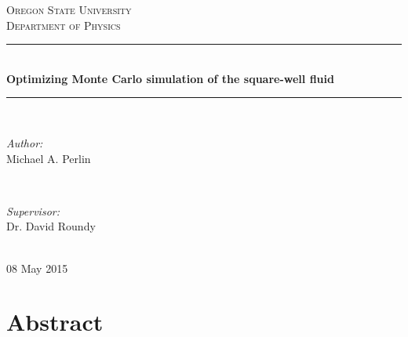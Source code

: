 \documentclass[11pt]{article}
\renewcommand{\title}{Optimizing Monte Carlo simulation of the
  square-well fluid} \renewcommand{\author}{Michael A. Perlin}
\newcommand{\institution}{Oregon State University}
\newcommand{\department}{Department of Physics}
\newcommand{\supervisor}{Dr. David Roundy}
\renewcommand{\date}{08 May 2015}
\begin{document}
\begin{titlepage}

  \newcommand{\HRule}{\rule{\linewidth}{0.5mm}}

  \center

  \textsc{\LARGE \institution}\\[1.5cm]
  \textsc{\Large \department}\\[0.5cm]

  \HRule \\[0.4cm]
  { \huge \bfseries \title}\\[0.4cm]
  \HRule \\[1.5cm]

  \begin{minipage}{0.4\textwidth}
    \begin{flushleft} \large
      \emph{Author:}\\
      \author
    \end{flushleft}
  \end{minipage}
  ~
  \begin{minipage}{0.4\textwidth}
    \begin{flushright} \large
      \emph{Supervisor:} \\
      \supervisor
    \end{flushright}
  \end{minipage}\\[4cm]

  {\large\date}

  \vfill

\end{titlepage}

\thispagestyle{empty}

\newpage

\tableofcontents

\thispagestyle{empty}

\newpage



\thispagestyle{empty}

\newpage

\setcounter{page}{1}


\section*{Abstract}
\label{sec:abstract}
\end{document}

